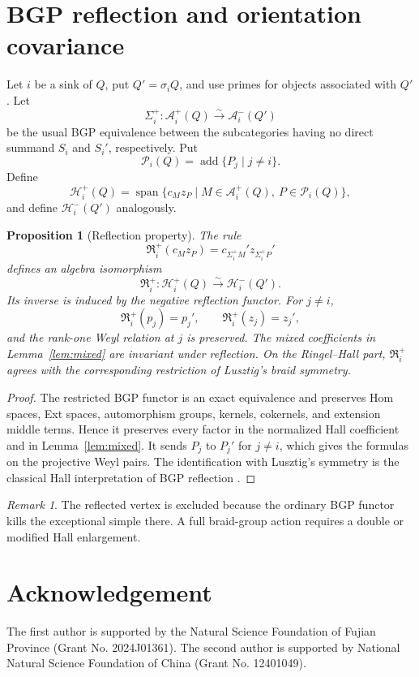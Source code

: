 \documentclass[12pt]{article}
\newcommand{\cA}{\mathcal A}
\newcommand{\cP}{\mathscr P}
\newcommand{\HH}{\mathscr H}
\newcommand{\add}{\operatorname{add}}
\theoremstyle{plain}
\newtheorem{proposition}[theorem]{Proposition}
\theoremstyle{remark}
\newtheorem{remark}[theorem]{Remark}
\begin{document}
\section{BGP reflection and orientation covariance}

Let $i$ be a sink of $Q$, put $Q'=\sigma_iQ$, and use primes for objects
associated with $Q'$. Let
\[
 \Sigma_i^+:\cA_i^+(Q)\xrightarrow{\sim}\cA_i^-(Q')
\]
be the usual BGP equivalence between the subcategories having no direct
summand $S_i$ and $S_i'$, respectively. Put
\[
 \cP_i(Q)=\add\{P_j\mid j\ne i\}.
\]
Define
\[
 \HH_i^+(Q)=\operatorname{span}\{c_Mz_P\mid
 M\in\cA_i^+(Q),\ P\in\cP_i(Q)\},
\]
and define $\HH_i^-(Q')$ analogously.

\begin{proposition}
[Reflection property]\label{thm:reflection}
The rule
\[
 \mathfrak R_i^+(c_Mz_P)=
 c_{\Sigma_i^+M}'z_{\Sigma_i^+P}'
\]
defines an algebra isomorphism
\[
 \mathfrak R_i^+:\HH_i^+(Q)\xrightarrow{\sim}\HH_i^-(Q').
\]
Its inverse is induced by the negative reflection functor. For $j\ne i$,
\[
 \mathfrak R_i^+(p_j)=p_j',\qquad
 \mathfrak R_i^+(z_j)=z_j',
\]
and the rank-one Weyl relation at $j$ is preserved. The mixed coefficients in
Lemma~\ref{lem:mixed} are invariant under reflection. On the Ringel--Hall
part, $\mathfrak R_i^+$ agrees with the corresponding restriction of
Lusztig's braid symmetry.
    
\end{proposition}

\begin{proof}
The restricted BGP functor is an exact equivalence and preserves Hom spaces,
Ext spaces, automorphism groups, kernels, cokernels, and extension middle
terms. Hence it preserves every factor in the normalized Hall coefficient
and in Lemma~\ref{lem:mixed}. It sends $P_j$ to $P_j'$ for $j\ne i$, which
gives the formulas on the projective Weyl pairs. The identification with
Lusztig's symmetry is the classical Hall interpretation of BGP reflection
\cite{XY01,DX02}.
\end{proof}

\begin{remark}
The reflected vertex is excluded because the ordinary BGP functor kills the
exceptional simple there. A full braid-group action requires a double or
modified Hall enlargement.
\end{remark}

\section*{Acknowledgement}
The first author is supported by the Natural Science Foundation of Fujian Province
(Grant No. 2024J01361). 
The second author is supported by National Natural Science Foundation of China (Grant No.  12401049).
\end{document}
